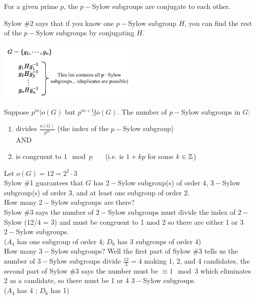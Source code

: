 \begin{theorem}[Sylow \#2] 
For a given prime $p$, the $p-$Sylow subgroups are conjugate to each other.
\end{theorem}
Sylow \#2 says that if you know one $p-$Sylow subgroup $H$, you can find the rest of the $p-$Sylow subgroups by conjugating $H$.\\
\begin{center}
    \includegraphics[width=0.5\textwidth]{Figures/Sylow2_conjugates.pdf} 
\end{center}
\begin{theorem}[Sylow \#3]
Suppose $p^m|o(G)$ but $p^{m+1}\not | o(G)$. The number of $p-$Sylow subgroups in $G$:
\begin{enumerate}
    \item divides $\frac{o(G)}{p^m}$ (the index of the $p-$Sylow subgroup) \steezybreak\\
    \noindent AND
    \item is congruent to $1\mod p$ \ \ \ (i.e. is $1+kp$ for some $k\in {\mathbb{ Z}}$)
\end{enumerate}
\end{theorem}
\begin{example}
Let $o(G)=12=2^2\cdot 3$ \steezybreak\\
Sylow \#1 guarantees that $G$ has $2-$Sylow subgroup(s) of order $4$, $3-$Sylow subgroup(s) of order 3, and at least one subgroup of order $2$. \steezybreak\\
How many $2-$Sylow subgroups are there? \steezybreak\\
Sylow \#3 says the number of $2-$Sylow subgroups must divide the index of $2-$Sylow (12/4 = 3) and must be congruent to 1 mod 2 so there are either 1 or 3 $2-$Sylow subgroups. \steezybreak\\
($A_4$ has one subgroup of order 4; $D_6$ has 3 subgroups of order 4) \steezybreak\\
How many $3-$Sylow subgroups? Well the first part of Sylow \#3 tells us the number of $3-$Sylow subgroups divide $\frac{12}{3}=4$ making 1, 2, and 4 candidates, the second part of Sylow \#3 says the number must be $\equiv 1\mod 3$ which eliminates $2$ as a candidate, so there must be 1 or 4 $3-$Sylow subgroups. \steezybreak\\
($A_4$ has 4 ; $D_6$ has 1)
\newpage
\end{example}

